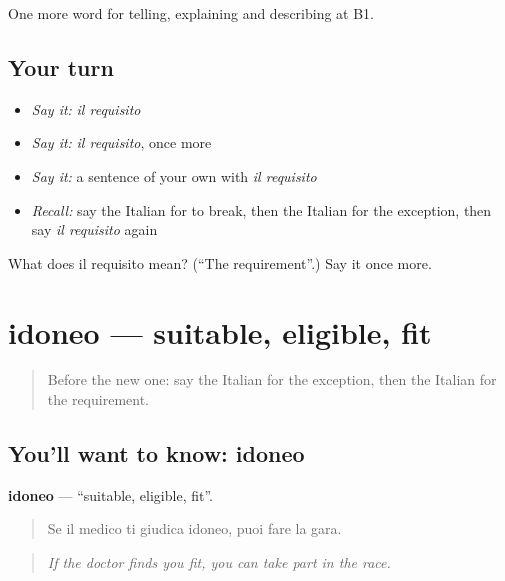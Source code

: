 \begin{grammarlens}[title={What you've built}]
One more word for telling, explaining and describing at B1.
\end{grammarlens}

\subsection*{Your turn}
\begin{itemize}
\raggedright
  \item \emph{Say it:} \emph{il requisito}
  \item \emph{Say it:} \emph{il requisito}, once more
  \item \emph{Say it:} a sentence of your own with \emph{il requisito}
  \item \emph{Recall:} say the Italian for to break, then the Italian for the exception, then say \emph{il requisito} again
\end{itemize}

\begin{tcolorbox}[breakable,colback=teal!4,colframe=teal!35!black,title={Before you move on}]
What does il requisito mean? (\textquotedblleft{}The requirement\textquotedblright{}.) Say it once more.
\end{tcolorbox}
\section[idoneo]{idoneo — suitable, eligible, fit}

\label{lesson:IT-C387-idoneo}



\begin{quote}
Before the new one: say the Italian for the exception, then the Italian for the requirement.
\end{quote}

\subsection*{You'll want to know: idoneo}
\textbf{idoneo} — \textquotedblleft{}suitable, eligible, fit\textquotedblright{}.

\begin{quote}
Se il medico ti giudica idoneo, puoi fare la gara.
\end{quote}

\begin{quote}
\emph{If the doctor finds you fit, you can take part in the race.}
\end{quote}

